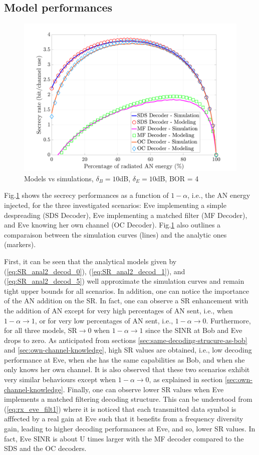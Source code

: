 \documentclass[12pt, draftclsnofoot, onecolumn]{IEEEtran}
\let\MYoriglatexcaption\caption
\renewcommand{\caption}[2][\relax]{\MYoriglatexcaption[#2]{#2}}
\begin{document}
\subsection{Model performances}
\begin{figure}[h!t]
	\centering
	\includegraphics[width=0.7\linewidth]{graphs/SISO_SR_10dB.pdf}
	\caption{Models vs simulations, $\delta_B = 10$dB,  $\delta_E = 10$dB, BOR = 4}
	\label{fig_modelvssimu}
\end{figure}
Fig.\ref{fig_modelvssimu} shows the secrecy performances as a function of $1-\alpha$, i.e., the AN energy injected, for the three investigated scenarios: Eve implementing a simple despreading (SDS Decoder), Eve implementing a matched filter (MF Decoder), and Eve knowing her own channel (OC Decoder). Fig.\ref{fig_modelvssimu} also outlines a comparaison between the simulation curves (lines) and the analytic ones (markers).

First, it can be seen that the analytical models given by (\ref{eq:SR_anal2_decod_0}), (\ref{eq:SR_anal2_decod_1}), and (\ref{eq:SR_anal2_decod_5}) well approximate the simulation curves and remain tight upper bounds for all scenarios.  In addition, one can notice the importance of the AN addition on the SR. In fact, one can observe a SR enhancement with the addition of AN except for very high percentages of AN sent, i.e., when $1-\alpha \to 1$, or for very low percentages of AN sent, i.e., $1-\alpha \to 0$. Furthermore, for all three models, SR$\to 0$ when $1-\alpha \to 1$ since the SINR at Bob and Eve drops to zero. As anticipated from sections \ref{sec:same-decoding-strucure-as-bob} and \ref{sec:own-channel-knowledge}, high SR values are obtained, i.e., low decoding performance at Eve, when she has the same capabilities as Bob, and when she only knows her own channel. It is also observed that these two scenarios exhibit very similar behaviours except when $1-\alpha \to 0$, as explained in section \ref{sec:own-channel-knowledge}. Finally, one can observe lower SR values when Eve implements a matched filtering decoding structure. This can be understood from (\ref{eq:rx_eve_filt1}) where it is  noticed that each transmitted data symbol is afffected by a real gain at Eve such that it benefits from a frequency diversity gain, leading to higher decoding performances at Eve, and so, lower SR values. In fact, Eve SINR is about U times larger with the MF decoder compared to the SDS and the OC decoders.
\end{document}
